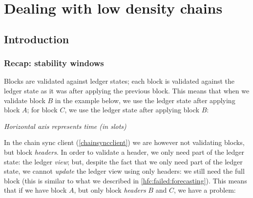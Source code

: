 \chapter{Dealing with low density chains}
\label{low-density}


\section{Introduction}

\subsection{Recap: stability windows}
\label{low-density:recap-stability-window}

Blocks are validated against ledger states; each block is validated against the
ledger state as it was after applying the previous block. This means that when
we validate block $B$ in the example below, we use the ledger state after
applying block $A$; for block $C$, we use the ledger state after applying block
$B$:
%
\begin{center}
\qquad
\begin{minipage}{0.25\textwidth}
\emph{Horizontal axis represents time (in slots)}
\end{minipage}
\end{center}
%
In the chain sync client (\cref{chainsyncclient}) we are however not validating
blocks, but block \emph{headers}. In order to validate a header, we only
need part of the ledger state: the ledger \emph{view}; but, despite the fact
that we only need part of the ledger state, we cannot \emph{update} the ledger
view using only headers: we still need the full block (this is similar to what
we described in \cref{hfc:failed:forecasting}). This means that if we have block
$A$, but only block \emph{headers} $B$ and $C$, we have a problem:
%
\begin{center}
\end{center}
